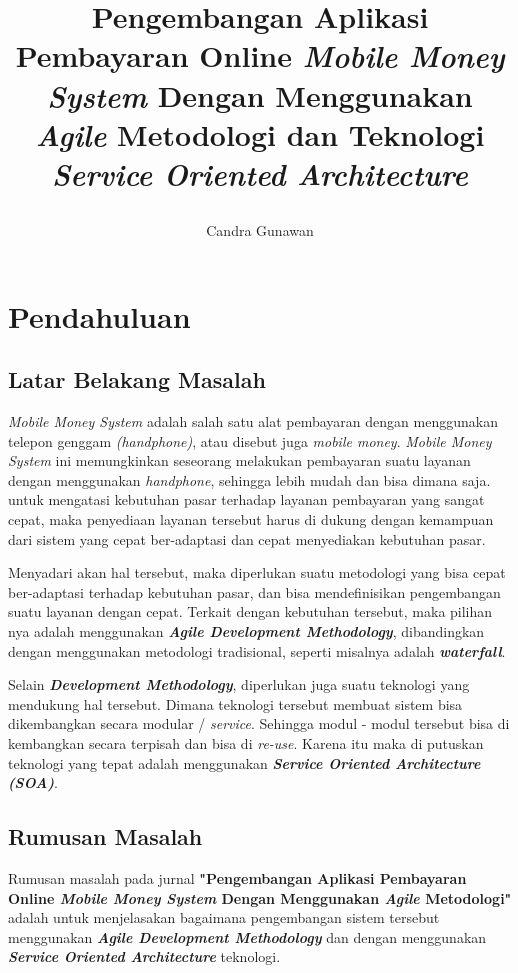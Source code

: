 \documentclass[9pt,twocolumn,twoside]{Gunadarma}
\title{\begin{center}
		Pengembangan Aplikasi Pembayaran Online \textit{Mobile Money System} Dengan Menggunakan \textit{Agile} Metodologi
dan Teknologi \textit{Service Oriented Architecture}   
	\end{center}}
\author[1]{Candra Gunawan}
\affil[1]{Magister Manajement Sistem Informasi, Universitas Gunadarma, 2016, Jakarta}
\affil[*]{Corresponding author: sherard@outlook.com}
\begin{document}
\maketitle
\thispagestyle{fancy}

\section{Pendahuluan}
\subsection{Latar Belakang Masalah}
\textit{Mobile Money System} adalah salah satu alat pembayaran dengan menggunakan telepon genggam \textit{(handphone)}, atau disebut juga \textit{mobile money}. \textit{Mobile Money System} ini memungkinkan seseorang melakukan pembayaran suatu layanan dengan menggunakan \textit{handphone}, sehingga lebih mudah dan bisa dimana saja. 
untuk mengatasi kebutuhan pasar terhadap layanan pembayaran yang sangat cepat, maka penyediaan layanan tersebut harus di dukung dengan kemampuan dari sistem yang cepat ber-adaptasi dan cepat menyediakan kebutuhan pasar. 

Menyadari akan hal tersebut, maka diperlukan suatu metodologi yang bisa cepat ber-adaptasi terhadap kebutuhan pasar, dan bisa mendefinisikan pengembangan suatu layanan dengan cepat. Terkait dengan kebutuhan tersebut, maka pilihan nya adalah menggunakan \textbf{\textit{Agile Development Methodology}}, dibandingkan dengan menggunakan metodologi tradisional, seperti misalnya adalah \textbf{\textit{waterfall}}. 

Selain \textbf{\textit{Development Methodology}}, diperlukan juga suatu teknologi yang mendukung hal tersebut. Dimana teknologi tersebut membuat sistem bisa dikembangkan secara modular / \textit{service}. Sehingga modul - modul tersebut bisa di kembangkan secara terpisah dan bisa di \textit{re-use}. Karena itu maka di putuskan teknologi yang tepat adalah menggunakan \textit{\textbf{Service Oriented Architecture (SOA)}}. 


\subsection{Rumusan Masalah}
Rumusan masalah pada jurnal \textbf{"Pengembangan Aplikasi Pembayaran Online \textit{Mobile Money System} Dengan Menggunakan \textit{Agile} Metodologi"} adalah untuk menjelasakan bagaimana pengembangan sistem tersebut menggunakan \textbf{\textit{Agile Development Methodology}} dan dengan menggunakan \textbf{\textit{Service Oriented Architecture}} teknologi. 
\end{document}
